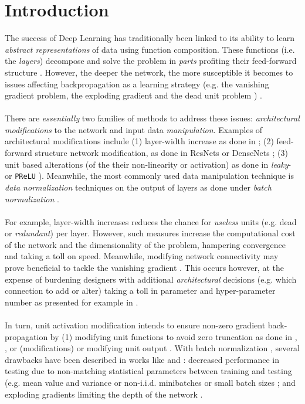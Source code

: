 \section{Introduction}\label{sec:introduction}

The success of Deep Learning has traditionally been linked to its ability to learn \emph{abstract representations} of data using function composition\cite{LeCun06atutorial}. These functions (i.e. the \emph{layers}) decompose and solve the problem in \emph{parts} \cite{resnetSubtree} profiting their feed-forward structure \cite{backprop}. However, the deeper the network, the more susceptible it becomes to issues affecting backpropagation as a learning strategy \cite{backprop} (e.g. the vanishing gradient problem, \cite{vanishing1,vanishing2} the exploding gradient \cite{exploding} and the dead unit problem \cite{leaky,whyreludie,whenneuronsfail}) . 
\\\\
There are \emph{essentially} two families of methods to address these issues: \emph{architectural modifications} to the network and input data \emph{manipulation}. Examples of architectural modifications include (1) layer-width increase as done in \cite{wideresnet,inceptionv1}; (2) feed-forward structure network modification, as done in ResNets \cite{resnet} or DenseNets \cite{densenet}; (3) unit based alterations (of the their non-linearity or activation) as done in \emph{leaky}-\ReLU \cite{leaky} or \texttt{PReLU} \cite{prelu}). Meanwhile, the most commonly used data manipulation technique is \emph{data normalization} techniques on the output of layers as done under \emph{batch normalization} \cite{batchnorm}.  
\\\\
For example, layer-width increases reduces the chance for \emph{useless} units (e.g. dead or \emph{redundant}) per layer. However, such measures increase the computational cost of the network and the dimensionality of the problem, hampering convergence \cite{cursedim} and taking a toll on speed. Meanwhile, modifying network connectivity may prove beneficial to tackle the vanishing gradient \cite{ladder,nin,highway}. This occurs however, at the expense of burdening designers with additional \emph{architectural} decisions (e.g. which connection to add or alter) taking a toll in parameter and hyper-parameter number as presented for example in \cite{densenet}. 
\\\\
In turn, unit activation modification intends to ensure non-zero gradient back-propagation by (1) modifying unit functions to avoid zero truncation as done in \cite{leaky}, \cite{prelu}, \cite{elu} or \cite{selu} (\ReLU modifications) or modifying unit output \cite{crelu}. With batch normalization \cite{batchnorm}, several drawbacks have been described in works like \cite{batchrenorm} and \cite{batchnormGradientExplosion}: decreased performance in testing due to non-matching statistical parameters between training and testing (e.g. mean value and variance or non-i.i.d. minibatches or small batch sizes \cite{batchrenorm}; and exploding gradients limiting the depth of the network \cite{batchnormGradientExplosion}.
